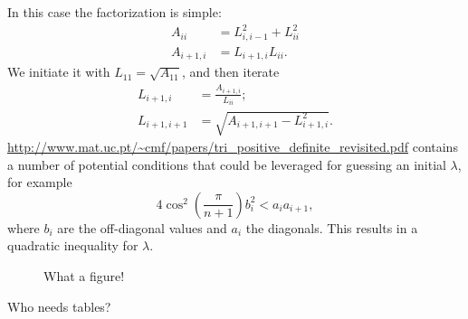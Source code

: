 \documentclass[letterpaper,abstracton]{scrartcl}
\def\eqs#1{Eqs.~\eqref{eq:#1}}
\begin{document}
In this case the factorization is simple:
\begin{subequations}
  \label{eq:cholA}
  \begin{align}
    A_{ii} &= L_{i,i-1}^2 + L_{ii}^2 \\
    A_{i+1,i} &= L_{i+1,i}L_{ii}.
  \end{align}
\end{subequations}
We initiate it with $L_{11} = \sqrt{A_{11}}$, and then iterate
\begin{subequations}
  \label{eq:cholL}
  \begin{align}
    L_{i+1,i} &= \frac{A_{i+1,i}}{L_{ii}}; \\
    L_{i+1,i+1} &= \sqrt{A_{i+1,i+1} - L_{i+1,i}^2}.
  \end{align}
\end{subequations}
\url{http://www.mat.uc.pt/~cmf/papers/tri_positive_definite_revisited.pdf} contains a number of potential conditions that could be leveraged for guessing an initial $\lambda$, for example
\begin{equation}
  4 \cos^2\left(\frac{\pi}{n+1}\right) b_i^2 < a_i a_{i+1},
\end{equation}
where $b_i$ are the off-diagonal values and $a_i$ the diagonals. This results in a quadratic inequality for $\lambda$.

\begin{figure}[h]
\caption{
What a figure!
\label{fig:example}
}
\end{figure}

\begin{table}[h]
\caption{
Who needs tables?
\label{tab:dumbtable}
}
\end{table}


\clearpage
\end{document}
